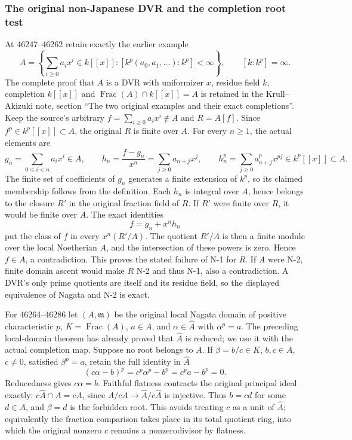 \subsubsection{The original non-Japanese DVR and the completion root test}\label{algebra-proof-067-the-original-non-japanese-dvr-and-the-completion-root-test}

At 46247--46262 retain exactly the earlier example \[
 A=\left\{\sum_{i\geq0}a_i x^i\in k[[x]]:
 [k^p(a_0,a_1,\ldots):k^p]<\infty\right\},
 \qquad [k:k^p]=\infty.
\] The complete proof that \(A\) is a DVR with uniformizer \(x\), residue field \(k\), completion \(k[[x]]\) and \(\operatorname{Frac}(A)\cap k[[x]]=A\) is retained in the Krull--Akizuki note, section ``The two original examples and their exact completions''. Keep the source's arbitrary \(f=\sum_{i\geq0}a_i x^i\notin A\) and \(R=A[f]\). Since \(f^p\in k^p[[x]]\subset A\), the original \(R\) is finite over \(A\). For every \(n\geq1\), the actual elements are \[
 g_n=\sum_{0\leq i<n}a_i x^i\in A,
 \qquad h_n=\frac{f-g_n}{x^n}=\sum_{j\geq0}a_{n+j}x^j,
 \qquad h_n^p=\sum_{j\geq0}a_{n+j}^{p}x^{pj}\in k^p[[x]]\subset A.
\] The finite set of coefficients of \(g_n\) generates a finite extension of \(k^p\), so its claimed membership follows from the definition. Each \(h_n\) is integral over \(A\), hence belongs to the closure \(R'\) in the original fraction field of \(R\). If \(R'\) were finite over \(R\), it would be finite over \(A\). The exact identities \[
 f=g_n+x^n h_n
\] put the class of \(f\) in every \(x^n(R'/A)\). The quotient \(R'/A\) is then a finite module over the local Noetherian \(A\), and the intersection of these powers is zero. Hence \(f\in A\), a contradiction. This proves the stated failure of N-1 for \(R\). If \(A\) were N-2, finite domain ascent would make \(R\) N-2 and thus N-1, also a contradiction. A DVR's only prime quotients are itself and its residue field, so the displayed equivalence of Nagata and N-2 is exact.

For 46264--46286 let \((A,\mathfrak m)\) be the original local Nagata domain of positive characteristic \(p\), \(K=\operatorname{Frac}(A)\), \(a\in A\), and \(\alpha\in\widehat A\) with \(\alpha^p=a\). The preceding local-domain theorem has already proved that \(\widehat A\) is reduced; we use it with the actual completion map. Suppose no root belongs to \(A\). If \(\beta=b/c\in K\), \(b,c\in A\), \(c\ne0\), satisfied \(\beta^p=a\), retain the full identity in \(\widehat A\) \[
 (c\alpha-b)^p=c^p\alpha^p-b^p=c^pa-b^p=0.
\] Reducedness gives \(c\alpha=b\). Faithful flatness contracts the original principal ideal exactly: \(c\widehat A\cap A=cA\), since \(A/cA\to\widehat A/c\widehat A\) is injective. Thus \(b=cd\) for some \(d\in A\), and \(\beta=d\) is the forbidden root. This avoids treating \(c\) as a unit of \(\widehat A\); equivalently the fraction comparison takes place in its total quotient ring, into which the original nonzero \(c\) remains a nonzerodivisor by flatness.

